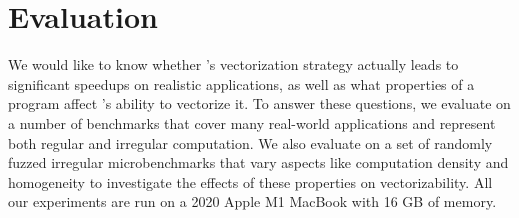 \section{Evaluation}\label{sec:eval}


We would like to know whether \system's vectorization strategy actually leads to significant speedups on realistic applications, as well as what properties of a program affect \system's ability to vectorize it.
To answer these questions, we evaluate \system on a number of benchmarks that cover many real-world applications and represent both regular and irregular computation.
We also evaluate \system on a set of randomly fuzzed irregular microbenchmarks that vary aspects like computation density and homogeneity to investigate the effects of these properties on vectorizability. %
All our experiments are run on a 2020 Apple M1 MacBook with 16 GB of memory. %

